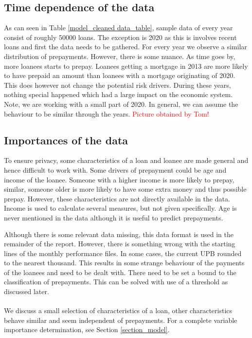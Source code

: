 \subsection{Time dependence of the data}
    As can seen in Table \ref{model_cleaned data_table}, sample data of every year consist of roughly 50000 loans. The exception is 2020 as this is involves recent loans and first the data needs to be gathered. For every year we observe a similar distribution of prepayments. However, there is some nuance. As time goes by, more loanees starts to prepay. Loanees getting a mortgage in 2013 are more likely to have prepaid an amount than loanees with a mortgage originating of 2020. This does however not change the potential risk drivers. During these years, nothing special happened which had a large impact on the economic system. Note, we are working with a small part of 2020. In general, we can assume the behaviour to be similar through the years.
    \textcolor{red}{Picture obtained by Tom!}

\subsection{Importances of the data}
    To ensure privacy, some characteristics of a loan and loanee are made general and hence difficult to work with. Some drivers of prepayment could be age and income of the loanee. Someone with a higher income is more likely to prepay, similar, someone older is more likely to have some extra money and thus possible prepay. However, these characteristics are not directly available in the data. Income is used to calculate several measures, but not given specifically. Age is never mentioned in the data although it is useful to predict prepayments.  

    Although there is some relevant data missing, this data format is used in the remainder of the report.  However, there is something wrong with the starting lines of the monthly performance files. In some cases, the current UPB rounded to the nearest thousand. This results in some strange behaviour of the payments of the loanees and need to be dealt with. There need to be set a bound to the classification of prepayments. This can be solved with use of a threshold as discussed later. 
    \\\\
    We discuss a small selection of characteristics of a loan, other characteristics behave similar and seem independent of prepayments. For a complete variable importance determination, see Section \ref{section_model}. 
    

